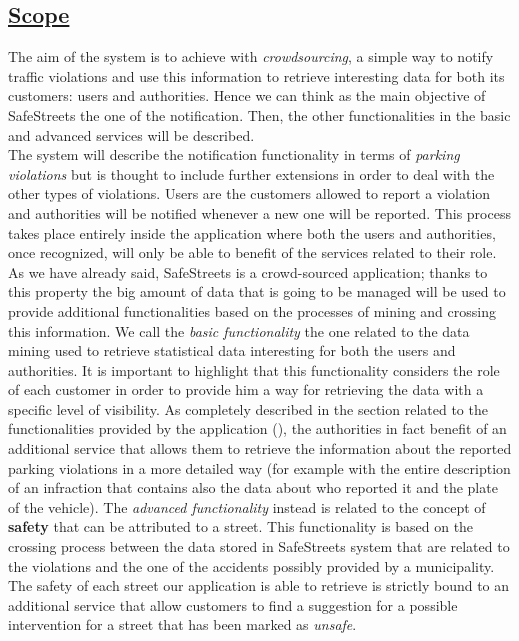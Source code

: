 \subsection[Scope]{\hyperlink{toc}{Scope}}
	The aim of the system is to achieve with \emph{crowdsourcing}, a simple way to notify traffic violations and use this information to retrieve interesting data for both its customers: users and authorities. Hence we can think as the main objective of SafeStreets the one of the notification. Then, the other functionalities in the basic and advanced services will be described.\\
	
	The system will describe the notification functionality in terms of \emph{parking violations} but is thought to include further extensions in order to deal with the other types of violations. Users are the customers allowed to report a violation and authorities will be notified whenever a new one will be reported. This process takes place entirely inside the application where both the users and authorities, once recognized, will only be able to benefit of the services related to their role. As we have already said, SafeStreets is a crowd-sourced application; thanks to this property the big amount of data that is going to be managed will be used to provide additional functionalities based on the processes of mining and crossing this information. We call the \emph{basic functionality} the one related to the data mining used to retrieve statistical data interesting for both the users and authorities. It is important to highlight that this functionality considers the role of each customer in order to provide him a way for retrieving the data with a specific level of visibility. As completely described in the section related to the functionalities provided by the application (), the authorities in fact benefit of an additional service that allows them to retrieve the information about the reported parking violations in a more detailed way (for example with the entire description of an infraction that contains also the data about who reported it and the plate of the vehicle). The \emph{advanced functionality} instead is related to the concept of \textbf{safety} that can be attributed to a street. This functionality is based on the crossing process between the data stored in SafeStreets system that are related to the violations and the one of the accidents possibly provided by a municipality. The safety of each street our application is able to retrieve is strictly bound to an additional service that allow customers to find a suggestion for a possible intervention for a street that has been marked as \emph{unsafe}.\\
	
